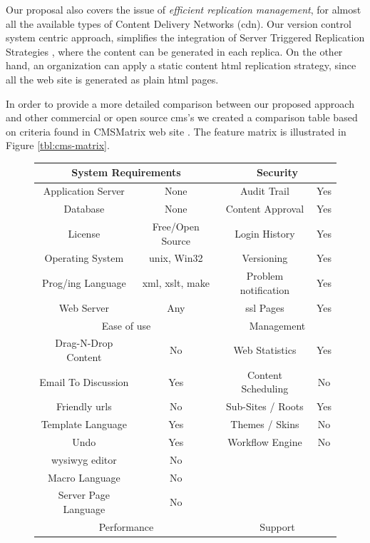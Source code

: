 \documentclass{elsart}
\begin{document}
Our proposal also covers the issue of \textit{efficient replication management}, for almost all the available types of Content Delivery Networks ({\sc cdn}). Our version control system centric approach, simplifies the integration of Server Triggered Replication Strategies \cite{SSPS04}, where the content can be generated in each replica. On the other hand, an organization can apply a static content {\sc html} replication strategy, since all the web site is generated as plain {\sc html} pages.

In order to provide a more detailed comparison between our proposed approach and other commercial or open source {\sc cms's} we 
created a comparison table based on criteria found in CMSMatrix web site \cite{PBC05}. The feature matrix is illustrated in Figure \ref{tbl:cms-matrix}.

\begin{figure}
\begin{center}
\begin{tabular}{c c | c c}
\hline
\multicolumn{2}{c|}{System Requirements} & \multicolumn{2}{c}{Security}\\
\hline
Application Server & None & Audit Trail & Yes\\
Database & None & Content Approval & Yes\\
License & Free/Open Source & Login History & Yes\\
Operating System & {\sc unix}, Win32 & Versioning & Yes\\
Prog/ing Language & {\sc xml, xslt}, make & Problem notification & Yes\\
Web Server & Any & {\sc ssl} Pages & Yes\\
\hline
\multicolumn{2}{c|}{Ease of use} & \multicolumn{2}{c}{Management}\\
\hline
Drag-N-Drop Content & No & Web Statistics & Yes\\
Email To Discussion & Yes & Content Scheduling & No\\
Friendly {\sc url}s & No & Sub-Sites / Roots & Yes\\
Template Language & Yes & Themes / Skins & No\\
Undo & Yes & Workflow Engine & No\\
{\sc wysiwyg} editor & No & &\\
Macro Language & No & &\\
Server Page Language & No & &\\
\hline
\multicolumn{2}{c|}{Performance} & \multicolumn{2}{c}{Support}\\

\end{tabular}
\end{center}
\end{figure}
\end{document}

